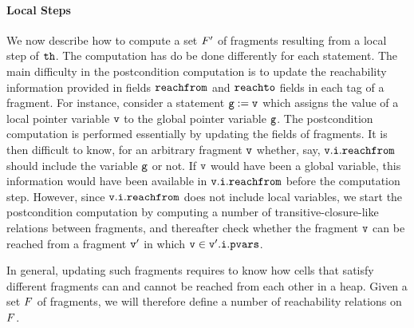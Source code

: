 \paragraph{Local Steps}
We now describe how to compute a set $F'$ of fragments resulting
from a local step of ${\tt th}$. The computation has do be done differently for
each statement.
The main difficulty in the
postcondition computation is to update the reachability information provided
in fields $\mathtt{reachfrom}$ and $\mathtt{reachto}$ fields in each tag of a 
fragment. For instance, consider a statement $\mathtt{g} := \mathtt{v}$
which assigns the value of a local pointer variable $\mathtt{v}$ to the global
pointer variable $\mathtt{g}$.
The postcondition computation is performed essentially
by updating the fields of fragments. It is then difficult to know,
for an arbitrary fragment $\mathtt{v}$ whether, say, $\mathtt{v}.\mathtt{i}.\mathtt{reachfrom}$
should include the variable $\mathtt{g}$ or not. If $\mathtt{v}$ would
have been a global variable, this information would have been available in
$\mathtt{v}.\mathtt{i}.\mathtt{reachfrom}$ before the computation step. However, since
$\mathtt{v}.\mathtt{i}.\mathtt{reachfrom}$ does not include local variables, we 
start the postcondition computation by computing a number of transitive-closure-like relations between fragments, and thereafter check whether the fragment
$\mathtt{v}$ can be reached from a fragment $\mathtt{v}'$ in which
$\mathtt{v}  \in \mathtt{v}'.\mathtt{i}.\mathtt{pvars}$.


In general, updating
such fragments requires to know how cells that satisfy different fragments
can and cannot be reached from each other in a heap. Given a set $F$ of
fragments, we will therefore define a number of reachability relations on
$F$.

